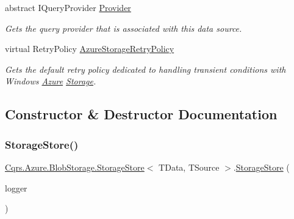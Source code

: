 \begin{DoxyCompactItemize}
abstract I\+Query\+Provider \hyperlink{classCqrs_1_1Azure_1_1BlobStorage_1_1StorageStore_a3cc5fd841fb449ca365d05a52e8e8438}{Provider}
\begin{DoxyCompactList}\small\item\em Gets the query provider that is associated with this data source. \end{DoxyCompactList}\item 
virtual Retry\+Policy \hyperlink{classCqrs_1_1Azure_1_1BlobStorage_1_1StorageStore_ad16f8d276c7570c95979b39098d1216b}{Azure\+Storage\+Retry\+Policy}
\begin{DoxyCompactList}\small\item\em Gets the default retry policy dedicated to handling transient conditions with Windows \hyperlink{namespaceCqrs_1_1Azure}{Azure} \hyperlink{namespaceCqrs_1_1Azure_1_1Storage}{Storage}. \end{DoxyCompactList}\end{DoxyCompactItemize}


\subsection{Constructor \& Destructor Documentation}
\mbox{\label{classCqrs_1_1Azure_1_1BlobStorage_1_1StorageStore_ae7a725cdcb7de73e097b02c19463bae7}} 
\subsubsection{\texorpdfstring{Storage\+Store()}{StorageStore()}}
{\footnotesize\ttfamily \hyperlink{classCqrs_1_1Azure_1_1BlobStorage_1_1StorageStore}{Cqrs.\+Azure.\+Blob\+Storage.\+Storage\+Store}$<$ T\+Data, T\+Source $>$.\hyperlink{classCqrs_1_1Azure_1_1BlobStorage_1_1StorageStore}{Storage\+Store} (\begin{DoxyParamCaption}\item[{I\+Logger}]{logger }\end{DoxyParamCaption})\hspace{0.3cm}{\ttfamily [protected]}}



